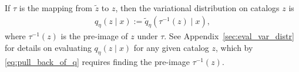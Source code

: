 

If $\tau$ is the mapping from $\tilde z$ to $z$,
then the variational distribution on catalogs $z$ is
\begin{align}
    q_\eta(z \mid x) := \tilde q_\eta(\tau^{-1}(z) \mid x),
    \label{eq:pull_back_of_q}
\end{align}
where $\tau^{-1}(z)$ is the pre-image of $z$ under $\tau$.
See Appendix~\ref{sec:eval_var_distr} for details on evaluating $q_\eta(z \mid x)$ for any given catalog $z$, which by \eqref{eq:pull_back_of_q} requires finding the pre-image $\tau^{-1}(z)$.








